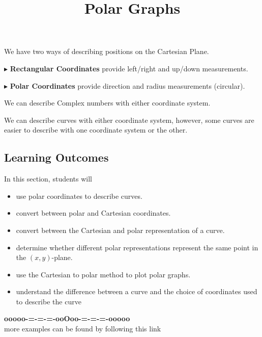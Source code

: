 \documentclass{ximera}
\title{Polar Graphs}
\begin{document}
\begin{abstract}
\end{abstract}
\maketitle





We have two ways of describing positions on the Cartesian Plane.


$\blacktriangleright$ \textbf{Rectangular Coordinates} provide left/right and up/down measurements.





$\blacktriangleright$ \textbf{Polar Coordinates} provide direction and radius measurements (circular).




We can describe Complex numbers with either coordinate system.


We can describe curves with either coordinate system, however, some curves are easier to describe with one coordinate system or the other.



\subsection*{Learning Outcomes}



\begin{sectionOutcomes}
In this section, students will 

\begin{itemize}
\item use polar coordinates to describe curves.
\item convert between polar and Cartesian coordinates.
\item convert between the Cartesian and polar representation of a curve.
\item determine whether different polar representations represent the same point in the $(x,y)$-plane.
\item use the Cartesian to polar method to plot polar graphs.
\item understand the difference between a curve and the choice of coordinates used to describe the curve
\end{itemize}
\end{sectionOutcomes}











\begin{center}
\textbf{\textcolor{green!50!black}{ooooo-=-=-=-ooOoo-=-=-=-ooooo}} \\

more examples can be found by following this link\\ 

\end{center}
\end{document}
